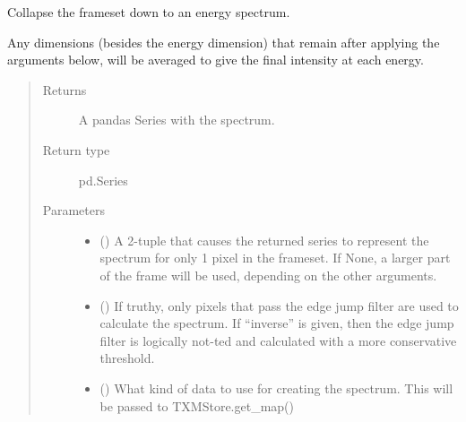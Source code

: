 \documentclass[letterpaper,10pt,english]{sphinxmanual}
\begin{document}
\begin{fulllineitems}
\begin{fulllineitems}
\begin{quote}
\begin{description}
\end{description}\end{quote}

\end{fulllineitems}


\begin{fulllineitems}
\label{\detokenize{xanespy:xanespy.xanes_frameset.XanesFrameset.spectrum}}
Collapse the frameset down to an energy spectrum.

Any dimensions (besides the energy dimension) that remain
after applying the arguments below, will be averaged to give
the final intensity at each energy.
\begin{quote}\begin{description}
\item[{Returns}] \leavevmode
{} \textendash{} A pandas Series with the spectrum.

\item[{Return type}] \leavevmode
pd.Series

\item[{Parameters}] \leavevmode\begin{itemize}
\item {} 
 (\sphinxstyleliteralemphasis{, }) \textendash{} A 2-tuple that causes the returned series to represent
the spectrum for only 1 pixel in the frameset. If None, a
larger part of the frame will be used, depending on the
other arguments.

\item {} 
 (\sphinxstyleliteralemphasis{, }) \textendash{} If truthy, only pixels that
pass the edge jump filter are used to calculate the
spectrum. If “inverse” is given, then the edge jump filter
is logically not-ted and calculated with a more
conservative threshold.

\item {} 
 (\sphinxstyleliteralemphasis{, }) \textendash{} What kind of data to use for creating the spectrum. This
will be passed to TXMStore.get\_map()


\end{itemize}
\end{description}
\end{quote}
\end{fulllineitems}
\end{fulllineitems}
\end{document}
